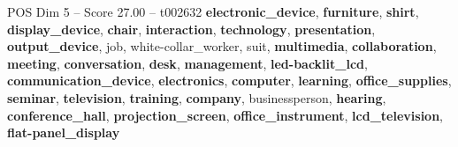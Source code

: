 \begin{textsample}{POS Dim 5 – Score 27.00 – t002632}  \label{ex:f5_pos_030}
\textbf{electronic\_device}, \textbf{furniture}, \textbf{shirt}, \textbf{display\_device}, \textbf{chair}, \textbf{interaction}, \textbf{technology}, \textbf{presentation}, \textbf{output\_device}, job, white-collar\_worker, suit, \textbf{multimedia}, \textbf{collaboration}, \textbf{meeting}, \textbf{conversation}, \textbf{desk}, \textbf{management}, \textbf{led-backlit\_lcd}, \textbf{communication\_device}, \textbf{electronics}, \textbf{computer}, \textbf{learning}, \textbf{office\_supplies}, \textbf{seminar}, \textbf{television}, \textbf{training}, \textbf{company}, businessperson, \textbf{hearing}, \textbf{conference\_hall}, \textbf{projection\_screen}, \textbf{office\_instrument}, \textbf{lcd\_television}, \textbf{flat-panel\_display}

\end{textsample}
